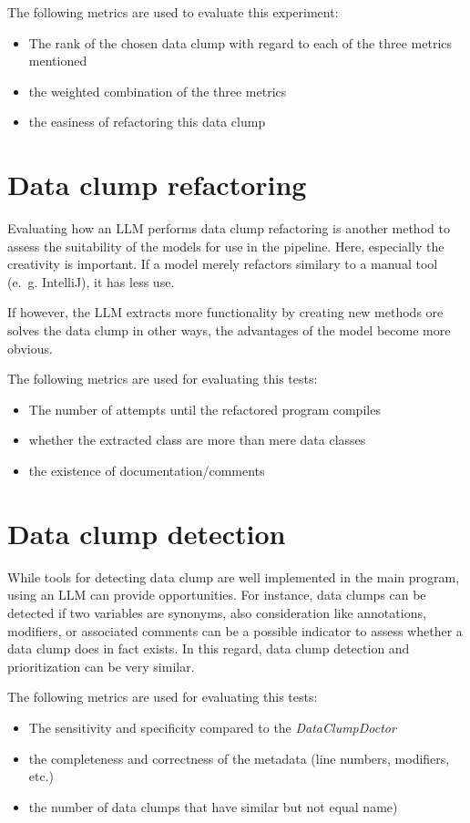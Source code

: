 The following metrics are used to evaluate this experiment:
\begin{itemize}
    \item The rank of the chosen data clump with regard to each of the three metrics mentioned
    \item the weighted combination of the three metrics
    \item the easiness of refactoring this data clump
\end{itemize}


\section{Data clump refactoring}

Evaluating how an \ac{LLM} performs data clump refactoring is another method to assess the suitability of the models for use in the pipeline. Here, especially the creativity is important. If a model merely refactors similary to a manual tool (e.~g. IntelliJ), it has less use.

If however, the \ac{LLM} extracts more functionality by creating new methods ore solves the data clump in other ways, the advantages of the model become more obvious.


The following metrics are used for evaluating this tests:

\begin{itemize}
    \item The number of attempts until the refactored program compiles
    \item whether the extracted class are more than mere data classes
    \item the existence of documentation/comments
\end{itemize}

\section{Data clump detection}

While tools for detecting data clump are well implemented in the main program, using an \ac{LLM} can provide opportunities. For instance, data clumps can be detected if two variables are synonyms, also consideration like annotations, modifiers, or associated comments can be a possible indicator to assess whether a data clump does in fact exists. In this regard, data clump detection and prioritization can be very similar. 

The following metrics are used for evaluating this tests:

\begin{itemize}
    \item The sensitivity and specificity compared to the \textit{DataClumpDoctor}
    \item the completeness and correctness of the metadata (line numbers, modifiers, etc.)
    \item the number of data clumps that have similar but not equal name)
\end{itemize}
